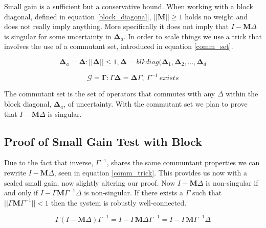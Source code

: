 \documentclass{article}[12pt]
\begin{document}
Small gain is a sufficient but a conservative bound. When working with a block diagonal, defined in equation \ref{block_diagonal}, $||\boldsymbol{M}|| \geq 1$ holds no weight and does not really imply anything. More specifically it does not imply that $I-\boldsymbol{M}\Delta$ is singular for some uncertainty in $\boldsymbol{\Delta}_a$. In order to scale things we use a trick that involves the use of a commutant set, introduced in equation \ref{comm_set}.

\begin{equation}
    \label{block_diagonal}
    \boldsymbol{\Delta}_a = {\boldsymbol{\Delta} : ||\boldsymbol{\Delta}|| \leq 1, \boldsymbol{\Delta} = blkdiag(\boldsymbol{\Delta}_1,\boldsymbol{\Delta}_2, \ldots, \boldsymbol{\Delta}_d}
\end{equation}

\begin{equation}
    \label{comm_set}
    \mathcal{G} = {\boldsymbol{\Gamma} : \Gamma\boldsymbol{\Delta} = \boldsymbol{\Delta}\Gamma, \: \Gamma^{-1} \: exists}
\end{equation}

\noindent The commutant set is the set of operators that commutes with any $\Delta$ within the block diagonal, $\boldsymbol{\Delta}_a$, of uncertainty. With the commutant set we plan to prove that $I-\boldsymbol{M}\Delta$ is singular.



\subsection{Proof of Small Gain Test with Block}

Due to the fact that inverse, $\Gamma^{-1}$, shares the same communtant properties we can rewrite $I-\boldsymbol{M}\Delta$, seen in equation \ref{comm_trick}. This provides us now with a scaled small gain, now slightly altering our proof. Now $I-\boldsymbol{M}\Delta$ is non-singular if and only if $I-\Gamma\boldsymbol{M}\Gamma^{-1}\Delta$ is non-singular. 
If there exists a $\Gamma$ such that $||\Gamma \boldsymbol{M}\Gamma^{-1}|| < 1$ then the system is robustly well-connected.

\begin{equation}
    \label{comm_trick}
    \Gamma(I-\boldsymbol{M}\Delta)\Gamma^{-1} = I-\Gamma\boldsymbol{M}\Delta\Gamma^{-1} = I-\Gamma\boldsymbol{M}\Gamma^{-1}\Delta
\end{equation}
\end{document}
